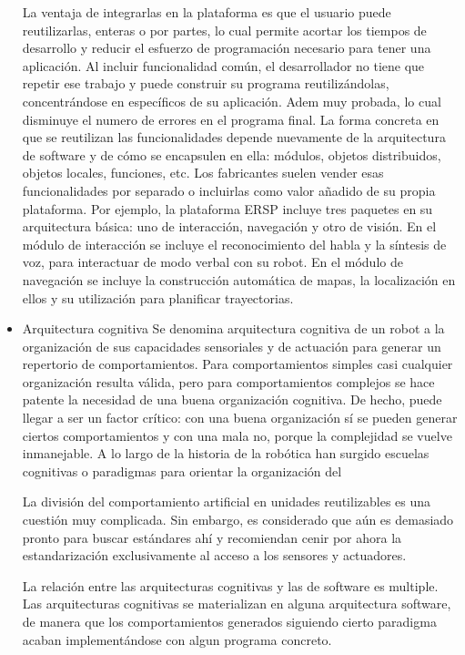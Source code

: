 \begin{itemize}
	La ventaja de integrarlas en la plataforma es que el usuario puede reutilizarlas, enteras o por partes, lo cual permite acortar los tiempos de desarrollo y reducir el esfuerzo de programación necesario para tener una aplicación. Al incluir funcionalidad común, el desarrollador no tiene que repetir ese trabajo y puede construir su programa reutilizándolas, concentrándose en específicos de su aplicación. Adem muy probada, lo cual disminuye el numero de errores en el programa final.
	La forma concreta en que se reutilizan las funcionalidades depende nuevamente de la arquitectura de software y de cómo se encapsulen en ella: módulos, objetos distribuidos, objetos locales, funciones, etc.
	Los fabricantes suelen vender esas funcionalidades por separado o incluirlas como valor añadido de su propia plataforma. Por ejemplo, la plataforma ERSP incluye tres paquetes en su arquitectura básica: uno de interacción, navegación y otro de visión. En el módulo de interacción se incluye el reconocimiento del habla y la síntesis de voz, para interactuar de modo verbal con su robot. En el módulo de navegación se incluye la construcción automática de mapas, la localización en ellos y su utilización para planificar trayectorias.

	\item Arquitectura cognitiva
	Se denomina arquitectura cognitiva de un robot a la organización de sus capacidades sensoriales y de actuación para generar un repertorio de comportamientos. Para comportamientos simples casi cualquier organización resulta válida, pero para comportamientos complejos se hace patente la necesidad de una buena organización cognitiva. De hecho, puede llegar a ser un factor crítico: con una buena organización sí se pueden generar ciertos comportamientos y con una mala no, porque la complejidad se vuelve inmanejable. A lo largo de la historia de la robótica han surgido escuelas cognitivas o paradigmas para orientar la organización del

	La división del comportamiento artificial en unidades reutilizables es una cuestión muy complicada. Sin embargo, es considerado que aún es demasiado pronto para buscar estándares ahí y recomiendan cenir por ahora la estandarización exclusivamente al acceso a los sensores y actuadores.

	La relación entre las arquitecturas cognitivas y las de software es multiple. Las arquitecturas cognitivas se materializan en alguna arquitectura software, de manera que los comportamientos generados siguiendo cierto paradigma acaban implementándose con algun programa concreto.


\end{itemize}
